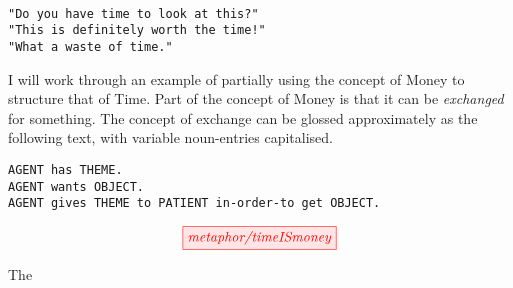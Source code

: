\\
\texttt{"Do you have time to look at this?"}\\
\texttt{"This is definitely worth the time!"}\\
\texttt{"What a waste of time."}

I will work through an example of partially using the concept of Money to structure that of Time. Part of the concept of Money is that it can be \emph{exchanged} for something. The concept of exchange can be glossed approximately as the following text, with variable noun-entries capitalised.

\texttt{AGENT has THEME.}\\
\texttt{AGENT wants OBJECT.}\\
\texttt{AGENT gives THEME to PATIENT in-order-to get OBJECT.}

\[\tikzfig{metaphor/timeISmoney}\]

The 

\subsection{}